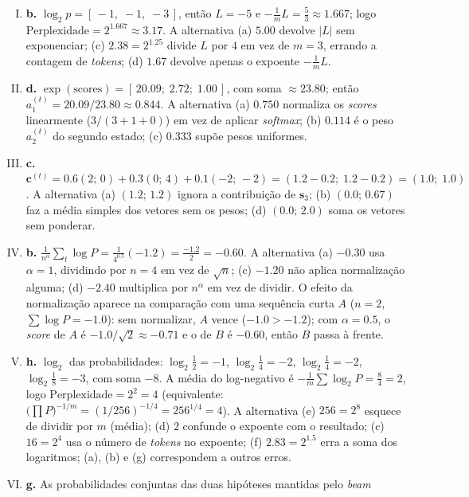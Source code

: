\documentclass{dlproblemset}
\begin{document}
\begin{enumerate}[I)]
    terceiro.
    \item \textbf{b.} $\log_2 p = [\,-1,\; -1,\; -3\,]$, então $L = -5$ e
    $-\frac{1}{m} L = \frac{5}{3} \approx 1.667$; logo
    $\text{Perplexidade} = 2^{1.667} \approx 3.17$. A alternativa (a) $5.00$ devolve
    $|L|$ sem exponenciar; (c) $2.38 = 2^{1.25}$ divide $L$ por $4$ em vez de $m = 3$, errando a
    contagem de \textit{tokens}; (d) $1.67$ devolve apenas o expoente $-\frac{1}{m}L$.
    \item \textbf{d.} $\exp(\text{scores}) = [\,20.09;\; 2.72;\; 1.00\,]$, com soma
    $\approx 23.80$; então $a_1^{(t)} = 20.09 / 23.80 \approx 0.844$. A alternativa (a)
    $0.750$ normaliza os \textit{scores} linearmente ($3/(3+1+0)$) em vez de aplicar
    \textit{softmax}; (b) $0.114$ é o peso $a_2^{(t)}$ do segundo estado; (c) $0.333$ supõe
    pesos uniformes.
    \item \textbf{c.}
    $\mathbf{c}^{(t)} = 0.6 (2;\, 0) + 0.3 (0;\, 4) + 0.1 ({-}2;\, {-}2)
    = (1.2 - 0.2;\; 1.2 - 0.2) = (1.0;\; 1.0)$. A alternativa (a) $(1.2;\, 1.2)$
    ignora a contribuição de $\mathbf{s}_3$; (b) $(0.0;\, 0.67)$ faz a média simples dos vetores sem
    os pesos; (d) $(0.0;\, 2.0)$ soma os vetores sem ponderar.
    \item \textbf{b.} $\frac{1}{n^{\alpha}} \sum_t \log P = \frac{1}{4^{0.5}} (-1.2) =
    \frac{-1.2}{2} = -0.60$. A alternativa (a) $-0.30$ usa $\alpha = 1$, dividindo por $n = 4$
    em vez de $\sqrt{n}$; (c) $-1.20$ não aplica normalização alguma; (d) $-2.40$ multiplica por
    $n^{\alpha}$ em vez de dividir. O efeito da normalização aparece na comparação com uma
    sequência curta $A$ ($n = 2$, $\sum \log P = -1.0$): sem normalizar, $A$ vence
    ($-1.0 > -1.2$); com $\alpha = 0.5$, o \textit{score} de $A$ é
    $-1.0/\sqrt{2} \approx -0.71$ e o de $B$ é $-0.60$, então $B$ passa à frente.
    \item \textbf{h.} $\log_2$ das probabilidades: $\log_2\tfrac12 = -1$, $\log_2\tfrac14 = -2$,
    $\log_2\tfrac14 = -2$, $\log_2\tfrac18 = -3$, com soma $-8$. A média do log-negativo é
    $-\frac{1}{m}\sum \log_2 P = \frac{8}{4} = 2$, logo $\text{Perplexidade} = 2^{2} = 4$
    (equivalente: $\big(\prod P\big)^{-1/m} = (1/256)^{-1/4} = 256^{1/4} = 4$). A alternativa
    (e) $256 = 2^{8}$ esquece de dividir por $m$ (média); (d) $2$ confunde o expoente com o
    resultado; (c) $16 = 2^4$ usa o número de \textit{tokens} no expoente; (f) $2.83 = 2^{1.5}$
    erra a soma dos logaritmos; (a), (b) e (g) correspondem a outros erros.
    \item \textbf{g.} As probabilidades conjuntas das duas hipóteses mantidas pelo \textit{beam}

\end{enumerate}
\end{document}
